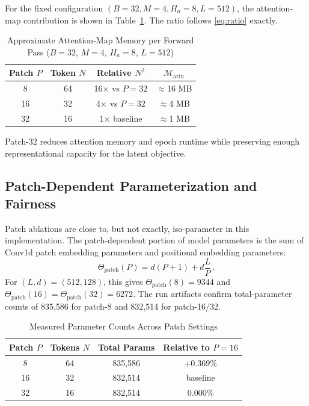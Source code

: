 \documentclass[journal]{IEEEtran}
\begin{document}
For the fixed configuration $(B=32, M=4, H_a=8, L=512)$, the attention-map contribution is shown in Table~\ref{tab:attn_mem}. The ratio follows \eqref{eq:ratio} exactly.

\begin{table}[t]
\caption{Approximate Attention-Map Memory per Forward Pass ($B{=}32$, $M{=}4$, $H_a{=}8$, $L{=}512$)}
\label{tab:attn_mem}
\centering
\begin{tabular}{cccc}
\toprule
Patch $P$ & Token $N$ & Relative $N^2$ & $\mathcal{M}_{\text{attn}}$ \\
\midrule
8  & 64 & 16$\times$ vs $P=32$ & $\approx$16 MB \\
16 & 32 & 4$\times$ vs $P=32$ & $\approx$4 MB \\
32 & 16 & 1$\times$ baseline & $\approx$1 MB \\
\bottomrule
\end{tabular}
\end{table}

Patch-32 reduces attention memory and epoch runtime while preserving enough representational capacity for the latent objective.

\subsection{Patch-Dependent Parameterization and Fairness}
Patch ablations are close to, but not exactly, iso-parameter in this implementation. The patch-dependent portion of model parameters is the sum of Conv1d patch embedding parameters and positional embedding parameters:
\begin{equation}
\Theta_{\text{patch}}(P) = d(P+1) + d\frac{L}{P}\,.
\label{eq:patch_params}
\end{equation}
For $(L,d)=(512,128)$, this gives $\Theta_{\text{patch}}(8)=9344$ and $\Theta_{\text{patch}}(16)=\Theta_{\text{patch}}(32)=6272$. The run artifacts confirm total-parameter counts of 835{,}586 for patch-8 and 832{,}514 for patch-16/32.

\begin{table}[t]
\caption{Measured Parameter Counts Across Patch Settings}
\label{tab:param_count}
\centering
\begin{tabular}{cccc}
\toprule
Patch $P$ & Tokens $N$ & Total Params & Relative to $P=16$ \\
\midrule
8  & 64 & 835{,}586 & +0.369\% \\
16 & 32 & 832{,}514 & baseline \\
32 & 16 & 832{,}514 & 0.000\% \\
\bottomrule
\end{tabular}
\end{table}
\end{document}
